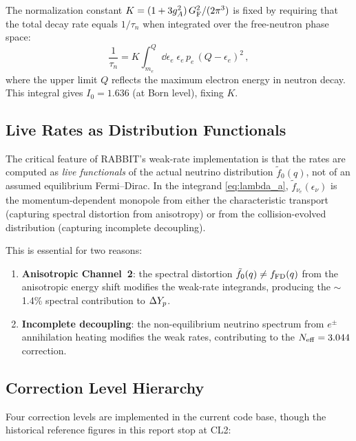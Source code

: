 The normalization constant $K = (1+3g_A^2)\,G_{\rm F}^2/(2\pi^3)$ is fixed by requiring that the total decay rate equals $1/\tau_n$ when integrated over the free-neutron phase space:
\begin{equation}
\frac{1}{\tau_n} = K\int_{m_e}^{Q} \dd\epsilon_e\;\epsilon_e\,p_e\,(Q-\epsilon_e)^2\,,
\end{equation}
where the upper limit $Q$ reflects the maximum electron energy in neutron decay.  This integral gives $I_0 = 1.636$ (at Born level), fixing $K$.

\subsection{Live Rates as Distribution Functionals}

The critical feature of RABBIT's weak-rate implementation is that the rates are computed as \emph{live functionals} of the actual neutrino distribution $\tilde{f}_0(q)$, not of an assumed equilibrium Fermi--Dirac.  In the integrand \eqref{eq:lambda_a}, $\tilde{f}_{\nu_e}(\epsilon_\nu)$ is the momentum-dependent monopole from either the characteristic transport (capturing spectral distortion from anisotropy) or from the collision-evolved distribution (capturing incomplete decoupling).

This is essential for two reasons:
\begin{enumerate}
\item \textbf{Anisotropic Channel~2}: the spectral distortion $\tilde{f}_0(q) \neq f_{\rm FD}(q)$ from the anisotropic energy shift modifies the weak-rate integrands, producing the $\sim$1.4\% spectral contribution to $\Delta Y_p$.
\item \textbf{Incomplete decoupling}: the non-equilibrium neutrino spectrum from $e^\pm$ annihilation heating modifies the weak rates, contributing to the $N_{\rm eff} = 3.044$ correction.
\end{enumerate}

\subsection{Correction Level Hierarchy}

Four correction levels are implemented in the current code base, though the historical reference figures in this report stop at CL2:

